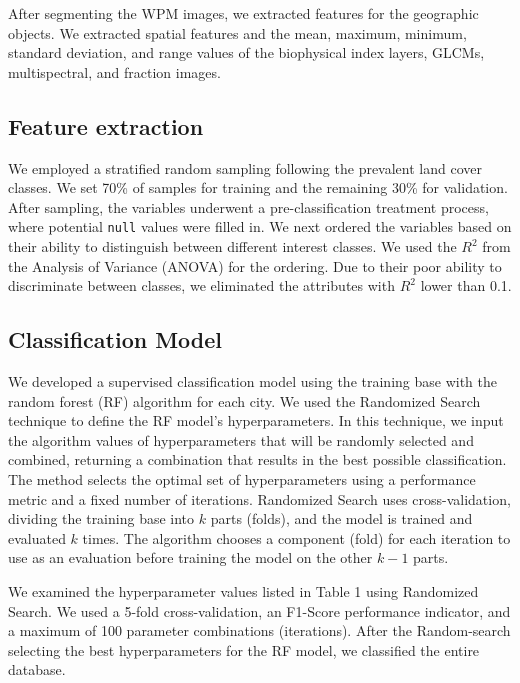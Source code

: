 \documentclass[preprint, 3p,
authoryear]{elsarticle} %
\begin{document}
After segmenting the WPM images, we extracted features for the
geographic objects. We extracted spatial features and the mean, maximum,
minimum, standard deviation, and range values of the biophysical index
layers, GLCMs, multispectral, and fraction images.

\hypertarget{feature-extraction}{%
\subsection{Feature extraction}\label{feature-extraction}}

We employed a stratified random sampling following the prevalent land
cover classes. We set 70\% of samples for training and the remaining
30\% for validation. After sampling, the variables underwent a
pre-classification treatment process, where potential \texttt{null}
values were filled in. We next ordered the variables based on their
ability to distinguish between different interest classes. We used the
\(R^2\) from the Analysis of Variance (ANOVA) for the ordering. Due to
their poor ability to discriminate between classes, we eliminated the
attributes with \(R^2\) lower than 0.1.

\hypertarget{classification-model}{%
\subsection{Classification Model}\label{classification-model}}

We developed a supervised classification model using the training base
with the random forest (RF) algorithm for each city. We used the
Randomized Search technique to define the RF model's hyperparameters. In
this technique, we input the algorithm values of hyperparameters that
will be randomly selected and combined, returning a combination that
results in the best possible classification. The method selects the
optimal set of hyperparameters using a performance metric and a fixed
number of iterations. Randomized Search uses cross-validation, dividing
the training base into \(k\) parts (folds), and the model is trained and
evaluated \(k\) times. The algorithm chooses a component (fold) for each
iteration to use as an evaluation before training the model on the other
\(k-1\) parts.

We examined the hyperparameter values listed in Table 1 using Randomized
Search. We used a 5-fold cross-validation, an F1-Score performance
indicator, and a maximum of 100 parameter combinations (iterations).
After the Random-search selecting the best hyperparameters for the RF
model, we classified the entire database.
\end{document}
